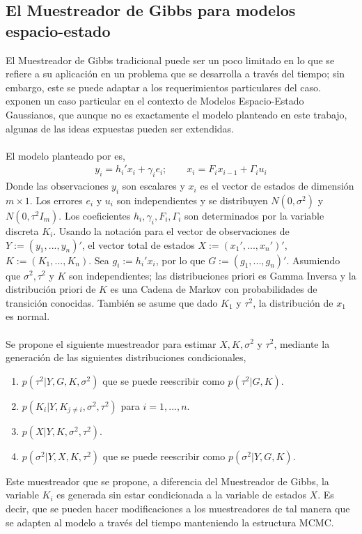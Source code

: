\subsection{El Muestreador de Gibbs para modelos espacio-estado}
El Muestreador de Gibbs tradicional puede ser un poco limitado en lo que se refiere a su aplicaci\'on en un problema que se desarrolla a trav\'es del tiempo; sin embargo, este se puede adaptar a los requerimientos particulares del caso. \cite{carter1996markov} exponen un caso particular en el contexto de Modelos Espacio-Estado Gaussianos, que aunque no es exactamente el modelo planteado en este trabajo, algunas de las ideas expuestas pueden ser extendidas.\\
\\
El modelo planteado por \cite{carter1996markov} es,
\begin{align*}
y_i=h_i'x_i+\gamma_ie_i; \qquad x_i=F_ix_{i-1}+\Gamma_iu_i
\end{align*}
Donde las observaciones $y_i$ son escalares y $x_i$ es el vector de estados de dimensi\'on $m\times 1$. Los errores $e_i$ y $u_i$ son independientes y se distribuyen $N(0,\sigma^2)$ y $N(0,\tau^2I_m)$. Los coeficientes $h_i,\gamma_i,F_i,\Gamma_i$ son determinados por la variable discreta $K_i$. Usando la notaci\'on para el vector de observaciones de $Y:=(y_1,...,y_n)'$, el vector total de estados $X:=(x_1',...,x_n')'$, $K:=(K_1,...,K_n)$. Sea $g_i:=h_i'x_i$, por lo que $G:=(g_1,...,g_n)'$. Asumiendo que $\sigma^2, \tau^2$ y $K$ son independientes; las distribuciones priori es Gamma Inversa y la distribuci\'on priori de $K$ es una Cadena de Markov con probabilidades de transici\'on conocidas. Tambi\'en se asume que dado $K_1$ y $\tau^2$, la distribuci\'on de $x_1$ es normal.\\
\\
Se propone el siguiente muestreador para estimar $X,K,\sigma^2$ y $\tau^2$, mediante la generaci\'on de las siguientes distribuciones condicionales,
\begin{enumerate}
\item $p(\tau^2|Y,G,K,\sigma^2)$ que se puede reescribir como $p(\tau^2|G,K)$.
\item $p(K_i|Y,K_{j \neq i},\sigma^2,\tau^2)$ para $i=1,...,n$.
\item $p(X|Y,K,\sigma^2,\tau^2)$.
\item $p(\sigma^2|Y,X,K,\tau^2)$ que se puede reescribir como $p(\sigma^2|Y,G,K)$.
\end{enumerate}
Este muestreador que se propone, a diferencia del Muestreador de Gibbs, la variable $K_i$ es generada sin estar condicionada a la variable de estados $X$. Es decir, que se pueden hacer modificaciones a los muestreadores de tal manera que se adapten al modelo a trav\'es del tiempo manteniendo la estructura MCMC.